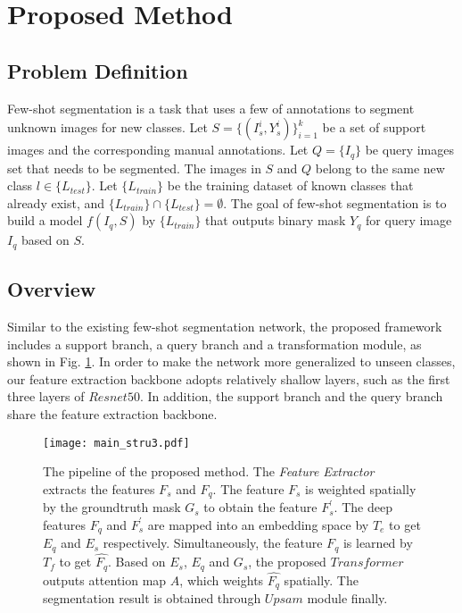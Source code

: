 \documentclass[runningheads]{llncs}
\begin{document}
\section{Proposed Method}
\subsection{Problem Definition}

Few-shot segmentation is a task that uses a few of annotations to segment unknown images for new classes. Let $S=\{(I^i_s,Y^i_s)\}^k_{i=1}$ be a set of support images and the corresponding manual annotations. Let $Q=\{I_q\}$ be query images set that needs to be segmented. 
The images in $S$ and $Q$ belong to the same new class $l\in\{L_{test}\}$. Let $\{L_{train}\}$ be the training dataset of known classes that already exist, and  $\{L_{train}\}\cap\{L_{test}\}=\emptyset$. The goal of few-shot segmentation is to build a model $f(I_q, S)$ by $\{L_{train}\}$ that outputs binary mask $Y_q$ for query image $I_q$ based on $S$.



\subsection{Overview}
Similar to the existing few-shot segmentation network, the proposed framework includes a support branch, a query branch and a transformation module, as shown in Fig. \ref{fig1}. In order to make the network more generalized to unseen classes, our feature extraction backbone adopts relatively shallow layers, such as the first three layers of $Resnet50$\cite{ref_resnet}. In addition, the support branch and the query branch share the feature extraction backbone.

\begin{figure}
\texttt{[image: main\_stru3.pdf]}
\caption{The pipeline of the proposed method. The \textit{Feature  Extractor} extracts the features $F_s$ and $F_q$. The feature $F_s$ is weighted spatially by the groundtruth mask $G_s$ to obtain the feature $F_{s}^{'}$. The deep features $F_q$ and $F_{s}^{'}$ are mapped into an embedding space by $T_e$ to get $E_q$ and $E_s$ respectively. Simultaneously, the feature $F_q$ is learned by $T_f$ to get $\hat{F_q}$. Based on $E_s$, $E_q$ and $G_s$, the proposed $Transformer$ outputs attention map $A$, which weights $\hat{F_q}$ spatially. The segmentation result is obtained through $Upsam$ module finally. }\label{fig1}
\end{figure}
\end{document}
